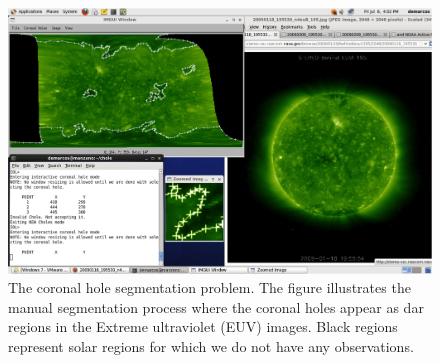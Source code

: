 \begin{figure}[!tb]
 \includegraphics[width=\linewidth]{pictures/thesis/chapter2/GUI.png}
 \caption{The coronal hole segmentation problem.
 	The figure illustrates the manual segmentation process where
 	    the coronal holes appear as dar regions in
 	    the Extreme ultraviolet (EUV) images.  
 	Black regions represent solar regions for which
 	    we do not have any observations.    	
     }
	\label{fig:idl_tool}
\end{figure}